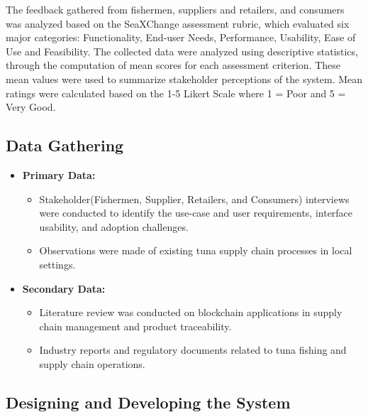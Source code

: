 The feedback gathered from fishermen, suppliers and retailers, and consumers was analyzed based on the SeaXChange assessment rubric, which evaluated six major categories: Functionality, End-user Needs, Performance, Usability, Ease of Use and Feasibility. The collected data were analyzed using descriptive statistics, through the computation of mean scores for each assessment criterion. These mean values were used to summarize stakeholder perceptions of the system. Mean ratings were calculated based on the 1-5 Likert Scale where 1 = Poor and 5 = Very Good.

\subsection{Data Gathering}
\begin{itemize}
	\item \textbf{Primary Data:} 
	\begin{itemize}
		\item Stakeholder(Fishermen, Supplier, Retailers, and Consumers) interviews were conducted to identify the use-case and user requirements, interface usability, and adoption challenges.
		\item Observations were made of existing tuna supply chain processes in local settings.
	\end{itemize}
	\item \textbf{Secondary Data:} 
	\begin{itemize}
		\item Literature review was conducted on blockchain applications in supply chain management and product traceability.
		\item Industry reports and regulatory documents related to tuna fishing and supply chain operations.
	\end{itemize}
\end{itemize}

\subsection{Designing and Developing the System}

